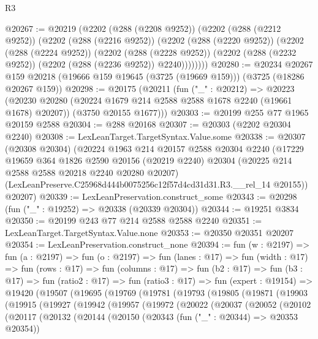 \begin{lexlean}{R3}
\begin{coremodule}
@20267 := @20219
    (@2202
      (@288 (@2208 @9252))
      (@2202
        (@288 (@2212 @9252))
        (@2202
          (@288 (@2216 @9252))
          (@2202
            (@288 (@2220 @9252))
            (@2202
              (@288 (@2224 @9252))
              (@2202
                (@288 (@2228 @9252))
                (@2202 (@288 (@2232 @9252)) (@2202 (@288 (@2236 @9252)) @2240))))))))
@20280 := @20234
    @20267
    @159
    @20218
    (@19666 @159 @19645 (@3725 (@19669 @159)))
    (@3725 (@18286 @20267 @159))
@20298 := @20175
    (@20211
      (fun ("_" : @20212) =>
      @20223
        (@20230 @20280 (@20224 @1679 @214 @2588 @2588 @1678 @2240 (@19661 @1678) @20207))
        (@3750 @20155 @1677)))
@20303 := @20199 @255 @77 @1965 @20159 @2588
@20304 := @288 @20168
@20307 := @20303 (@2202 @20304 @2240)
@20308 := LexLeanTarget.TargetSyntax.Value.some
@20338 := @20307
    (@20308 @20304)
    (@20224
      @1963
      @214
      @20157
      @2588
      @20304
      @2240
      (@17229
        @19659
        @364
        @1826
        @2590
        @20156
        (@20219 @2240)
        @20304
        (@20225 @214 @2588 @2588 @20218 @2240 @20280 @20207)
        (LexLeanPreserve.C25968d444b0075256c12f57d4cd31d31.R3.__rel_14 @20155))
      @20207)
@20339 := LexLeanPreservation.construct_some
@20343 := @20298 (fun ("_" : @19252) => @20338 (@20339 @20304))
@20344 := @19251 @3834
@20350 := @20199 @243 @77 @214 @2588 @2588 @2240
@20351 := LexLeanTarget.TargetSyntax.Value.none
@20353 := @20350 @20351 @20207
@20354 := LexLeanPreservation.construct_none
@20394 := fun (w : @2197) =>
  fun (a : @2197) =>
  fun (o : @2197) =>
  fun (lanes : @17) =>
  fun (width : @17) =>
  fun (rows : @17) =>
  fun (columns : @17) =>
  fun (b2 : @17) =>
  fun (b3 : @17) =>
  fun (ratio2 : @17) =>
  fun (ratio3 : @17) =>
  fun (expert : @19154) =>
  @19420
    (@19507
      (@19695
        (@19769
          (@19781
            (@19793
              (@19805
                (@19871
                  (@19903
                    (@19915
                      (@19927
                        (@19942
                          (@19957
                            (@19972
                              (@20022
                                (@20037
                                  (@20052
                                    (@20102
                                      (@20117
                                        (@20132
                                          (@20144
                                            (@20150
                                              (@20343 (fun ("_" : @20344) => @20353 @20354))

\end{coremodule}
\end{lexlean}
